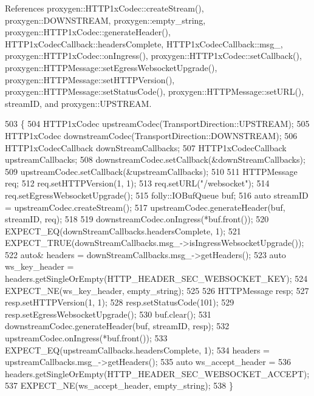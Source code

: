 References proxygen\+::\+H\+T\+T\+P1x\+Codec\+::create\+Stream(), proxygen\+::\+D\+O\+W\+N\+S\+T\+R\+E\+AM, proxygen\+::empty\+\_\+string, proxygen\+::\+H\+T\+T\+P1x\+Codec\+::generate\+Header(), H\+T\+T\+P1x\+Codec\+Callback\+::headers\+Complete, H\+T\+T\+P1x\+Codec\+Callback\+::msg\+\_\+, proxygen\+::\+H\+T\+T\+P1x\+Codec\+::on\+Ingress(), proxygen\+::\+H\+T\+T\+P1x\+Codec\+::set\+Callback(), proxygen\+::\+H\+T\+T\+P\+Message\+::set\+Egress\+Websocket\+Upgrade(), proxygen\+::\+H\+T\+T\+P\+Message\+::set\+H\+T\+T\+P\+Version(), proxygen\+::\+H\+T\+T\+P\+Message\+::set\+Status\+Code(), proxygen\+::\+H\+T\+T\+P\+Message\+::set\+U\+R\+L(), stream\+ID, and proxygen\+::\+U\+P\+S\+T\+R\+E\+AM.


\begin{DoxyCode}
503                                         \{
504   HTTP1xCodec upstreamCodec(TransportDirection::UPSTREAM);
505   HTTP1xCodec downstreamCodec(TransportDirection::DOWNSTREAM);
506   HTTP1xCodecCallback downStreamCallbacks;
507   HTTP1xCodecCallback upstreamCallbacks;
508   downstreamCodec.setCallback(&downStreamCallbacks);
509   upstreamCodec.setCallback(&upstreamCallbacks);
510 
511   HTTPMessage req;
512   req.setHTTPVersion(1, 1);
513   req.setURL(\textcolor{stringliteral}{"/websocket"});
514   req.setEgressWebsocketUpgrade();
515   folly::IOBufQueue buf;
516   \textcolor{keyword}{auto} streamID = upstreamCodec.createStream();
517   upstreamCodec.generateHeader(buf, streamID, req);
518 
519   downstreamCodec.onIngress(*buf.front());
520   EXPECT\_EQ(downStreamCallbacks.headersComplete, 1);
521   EXPECT\_TRUE(downStreamCallbacks.msg_->isIngressWebsocketUpgrade());
522   \textcolor{keyword}{auto}& headers = downStreamCallbacks.msg_->getHeaders();
523   \textcolor{keyword}{auto} ws\_key\_header = headers.getSingleOrEmpty(HTTP\_HEADER\_SEC\_WEBSOCKET\_KEY);
524   EXPECT\_NE(ws\_key\_header, empty_string);
525 
526   HTTPMessage resp;
527   resp.setHTTPVersion(1, 1);
528   resp.setStatusCode(101);
529   resp.setEgressWebsocketUpgrade();
530   buf.clear();
531   downstreamCodec.generateHeader(buf, streamID, resp);
532   upstreamCodec.onIngress(*buf.front());
533   EXPECT\_EQ(upstreamCallbacks.headersComplete, 1);
534   headers = upstreamCallbacks.msg_->getHeaders();
535   \textcolor{keyword}{auto} ws\_accept\_header =
536     headers.getSingleOrEmpty(HTTP\_HEADER\_SEC\_WEBSOCKET\_ACCEPT);
537   EXPECT\_NE(ws\_accept\_header, empty_string);
538 \}
\end{DoxyCode}
